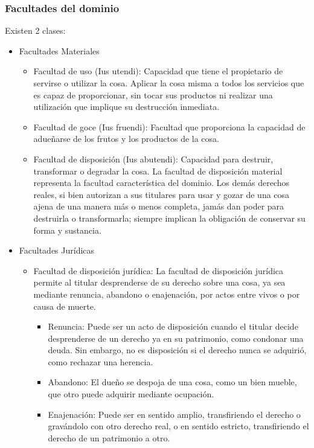 \documentclass{templateNote}
\begin{document}
\subsubsection{Facultades del dominio}
\noindent Existen 2 clases:
\begin{itemize}
    \item Facultades Materiales
    \begin{itemize}
        \item Facultad de uso (Ius utendi): Capacidad que tiene el propietario de servirse o utilizar la cosa. Aplicar la cosa misma a todos los servicios que es capaz de proporcionar, sin tocar sus productos ni realizar una utilización que implique su destrucción inmediata. 
        \item Facultad de goce (Ius fruendi): Facultad que proporciona la capacidad de adueñarse de los frutos y los productos de la cosa. 
        \item Facultad de disposición (Ius abutendi): Capacidad para destruir, transformar o degradar la cosa. La facultad de disposición material representa la facultad característica del dominio. Los demás derechos reales, si bien autorizan a sus titulares para usar y gozar de una cosa ajena de una manera más o menos completa, jamás dan poder para destruirla o transformarla; siempre implican la obligación de conservar su forma y sustancia.
    \end{itemize}
    \item Facultades Jurídicas
    \begin{itemize}
        \item Facultad de disposición jurídica: La facultad de disposición jurídica permite al titular desprenderse de su derecho sobre una cosa, ya sea mediante renuncia, abandono o enajenación, por actos entre vivos o por causa de muerte.
        \begin{itemize}
            \item Renuncia: Puede ser un acto de disposición cuando el titular decide desprenderse de un derecho ya en su patrimonio, como condonar una deuda. Sin embargo, no es disposición si el derecho nunca se adquirió, como rechazar una herencia.
            \item Abandono: El dueño se despoja de una cosa, como un bien mueble, que otro puede adquirir mediante ocupación.
            \item Enajenación: Puede ser en sentido amplio, transfiriendo el derecho o gravándolo con otro derecho real, o en sentido estricto, transfiriendo el derecho de un patrimonio a otro.
        \end{itemize}
    \end{itemize}
\end{itemize}
\end{document}
